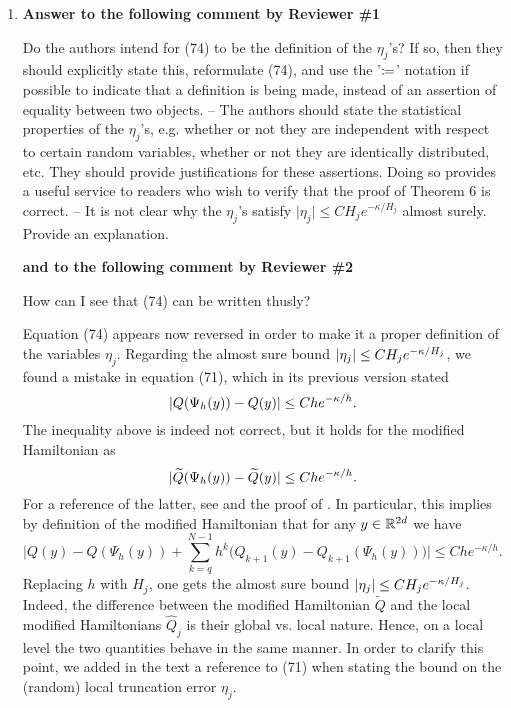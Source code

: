 \documentclass[10pt]{article}
\begin{document}
\begin{enumerate}
	\item \textbf{Answer to the following comment by Reviewer \#1}
	\begin{itquote}
		Do the authors intend for (74) to be the definition of the $\eta_j$'s? If so, then they should explicitly state this, reformulate (74), and use the '$\coloneqq$' notation if possible to indicate that a definition is being made, instead of an assertion of equality between two objects. -- The authors should state the statistical properties of the $\eta_j$'s, e.g. whether or not they are independent with respect to certain random variables, whether or not they are identically distributed, etc. They should provide justifications for these assertions. Doing so provides a useful service to readers who wish to verify that the proof of Theorem 6 is correct. -- It is not clear why the $\eta_j$'s satisfy $\vert\eta_j\vert\leq CH_j e^{-\kappa/H_j}$ almost surely. Provide an explanation.
	\end{itquote}
	\textbf{and to the following comment by Reviewer \#2}
	\begin{itquote}
		How can I see that (74) can be written thusly?
	\end{itquote}
	Equation (74) appears now reversed in order to make it a proper definition of the variables $\eta_j$. Regarding the almost sure bound $\lvert\eta_j\rvert \leq CH_je^{-\kappa/H_j}$, we found a mistake in equation (71), which in its previous version stated
	\begin{equation*}
		\lvert Q(\Psi_h(y)) - Q(y)\rvert \leq Che^{-\kappa/h}.
	\end{equation*}
	The inequality above is indeed not correct, but it holds for the modified Hamiltonian as
	\begin{equation*}
	\lvert\widetilde Q(\Psi_h(y)) - \widetilde Q(y)\rvert \leq Che^{-\kappa/h}.
	\end{equation*}
	For a reference of the latter, see \cite[Theorem IX.7.6]{HLW06} and the proof of \cite[Theorem IX.8.1]{HLW06}. In particular, this implies by definition of the modified Hamiltonian that for any $y \in \mathbb{R}^{2d}$ we have
	\begin{equation*}
		\Big\lvert Q(y) - Q(\Psi_h(y)) + \sum_{k=q}^{N-1} h^k \big(Q_{k+1}(y) - Q_{k+1}(\Psi_h(y))\big)\Big\rvert \leq Che^{-\kappa/h}.
	\end{equation*}
	Replacing $h$ with $H_j$, one gets the almost sure bound $\lvert\eta_j\rvert \leq CH_je^{-\kappa/H_j}$. Indeed, the difference between the modified Hamiltonian $\tilde Q$ and the local modified Hamiltonians $\hat Q_j$ is their global vs. local nature. Hence, on a local level the two quantities behave in the same manner. In order to clarify this point, we added in the text a reference to (71) when stating the bound on the (random) local truncation error $\eta_j$.
	

\end{enumerate}
\end{document}

